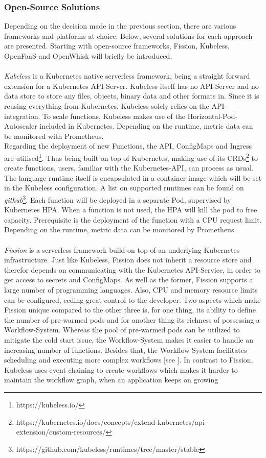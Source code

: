 \documentclass[a4paper,twoside,11pt, pagesize]{scrartcl}
\begin{document}
\subsubsection{Open-Source Solutions}
Depending on the decision made in the previous section, there are various frameworks and platforms at choice. Below, several solutions for each approach are presented. Starting with open-source frameworks, Fission, Kubeless, OpenFaaS and OpenWhisk will briefly be introduced.\\\\ \textit{Kubeless} is a Kubernetes native serverless framework, being a straight forward extension for a Kubernetes API-Server. Kubeless itself has no API-Server and no data store to store any files, objects, binary data and other formats in. Since it is reusing everything from Kubernetes, Kubeless solely relies on the API-integration. To scale functions, Kubeless makes use of the Horizontal-Pod-Autoscaler included in Kubernetes. Depending on the runtime, metric data can be monitored with Prometheus.\\Regarding the deployment of new Functions, the API, ConfigMaps and Ingress are utilised\footnote{https://kubeless.io/}. Thus being built on top of Kubernetes, making use of its CRDs\footnote{https://kubernetes.io/docs/concepts/extend-kubernetes/api-extension/custom-resources/} to create functions, users, familiar with the Kubernetes-API, can process as usual. The language-runtime itself is encapsulated in a container image which will be set in the Kubeless configuration. A list on supported runtimes can be found on \textit{github}\footnote{https://github.com/kubeless/runtimes/tree/master/stable}. Each function will be deployed in a separate Pod, supervised by Kubernetes HPA. When a function is not used, the HPA will kill the pod to free capacity. Prerequisite is the deployment of the function with a CPU request limit. Depending on the runtime, metric data can be monitored by Prometheus.\\\\ \textit{Fission} is a serverless framework build on top of an underlying Kubernetes infrastructure. Just like Kubeless, Fission does not inherit a resource store and therefor depends on communicating with the Kubernetes API-Service, in order to get access to secrets and ConfigMaps. As well as the former, Fission supports a large number of programming languages. Also, CPU and memory resource limits can be configured, ceding great control to the developer. Two aspects which make Fission unique compared to the other three is, for one thing, its ability to define the number of pre-warmed pods and for another thing its richness of possessing a Workflow-System. Whereas the pool of pre-warmed pods can be utilized to mitigate the cold start issue, the Workflow-System makes it easier to handle an increasing number of functions. Besides that, the Workflow-System facilitates scheduling and executing more complex workflows [see \cite{kritikos2018review}]. In contrast to Fission, Kubeless uses event chaining to create workflows which makes it harder to maintain the workflow graph, when an application keeps on growing 
\end{document}

